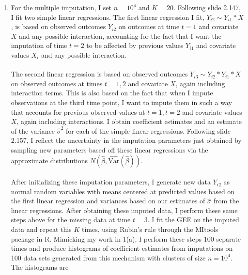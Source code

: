 \documentclass[11pt]{article}
\newcommand{\Var}{\mathrm{Var}}
\begin{document}
\begin{enumerate}
\begin{enumerate}
			\item For the multiple imputation, I set $n=10^4$ and $K=20$. Following slide 2.147, I fit two simple linear regressions. The first linear regression I fit, $Y_{i2}\sim Y_{i1}*X$, is based on observed outcomes $Y_{i2}$ on outcomes at time $t=1$ and covariate $X$ and any possible interaction, accounting for the fact that I want the imputation of time $t=2$ to be affected by previous values $Y_{i1}$ and covariate values $X_i$ and any possible interaction. \\ \\The second linear regression is based on observed outcomes $Y_{i3}\sim Y_{i2}*Y_{i1}*X$ on observed outcomes at times $t=1,2$ and covariate $X$, again including interaction terms. This is also based on the fact that when I impute observations at the third time point, I want to impute them in such a way that accounts for previous observed values at $t=1,t=2$ and covariate values $X$, again including interactions. I obtain coefficient estimates and an estimate of the variance $\widehat{\sigma}^2$ for each of the simple linear regressions. Following slide 2.157, I reflect the uncertainty in the imputation parameters just obtained by sampling new parameters based off these linear regressions via the approximate distributions $N(\widehat{\beta},\widehat{\Var}(\widehat{\beta}))$. \\ \\
		After initializing these imputation parameters, I generate new data $Y_{i2}$ as normal random variables with means centered at predicted values based on the first linear regression and variances based on our estimates of $\widehat{\sigma}$ from the linear regressions. After obtaining these imputed data, I perform these same steps above for the missing data at time $t=3$. I fit the GEE on the imputed data and repeat this $K$ times, using Rubin's rule through the MItools package in R. Mimicking my work in 1(a), I perform these steps 100 separate times and produce histograms of coefficient estimates from imputations on 100 data sets generated from this mechanism with clusters of size $n=10^4$. The histograms are
			\begin{figure}[H]

\end{figure}
\end{enumerate}
\end{enumerate}
\end{document}
